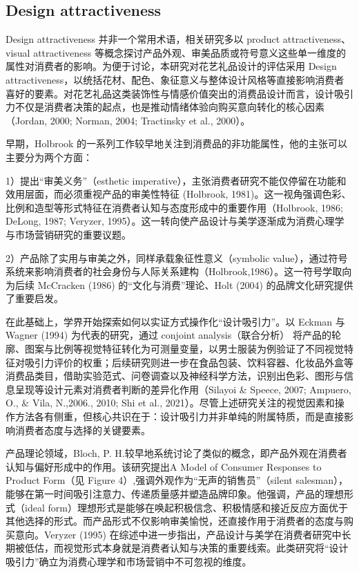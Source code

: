 \subsection{Design attractiveness}

Design attractiveness 并非一个常用术语，相关研究多以 product attractiveness、visual attractiveness 等概念探讨产品外观、审美品质或符号意义这些单一维度的属性对消费者的影响。为便于讨论，本研究对花艺礼品设计的评估采用 Design attractiveness，以统括花材、配色、象征意义与整体设计风格等直接影响消费者喜好的要素。对花艺礼品这类装饰性与情感价值突出的消费品设计而言，设计吸引力不仅是消费者决策的起点，也是推动情绪体验向购买意向转化的核心因素（Jordan, 2000; Norman, 2004; Tractinsky et al., 2000）。

早期，Holbrook 的一系列工作较早地关注到消费品的非功能属性，他的主张可以主要分为两个方面：

1）提出“审美义务”（esthetic imperative），主张消费者研究不能仅停留在功能和效用层面，而必须重视产品的审美性特征 (Holbrook, 1981)。这一视角强调色彩、比例和造型等形式特征在消费者认知与态度形成中的重要作用（Holbrook, 1986; DeLong, 1987; Veryzer, 1995）。这一转向使产品设计与美学逐渐成为消费心理学与市场营销研究的重要议题。

2）产品除了实用与审美之外，同样承载象征性意义（symbolic value），通过符号系统来影响消费者的社会身份与人际关系建构（Holbrook,1986）。这一符号学取向为后续 McCracken (1986) 的“文化与消费”理论、Holt (2004) 的品牌文化研究提供了重要启发。

在此基础上，学界开始探索如何以实证方式操作化“设计吸引力”。以 Eckman 与 Wagner (1994) 为代表的研究，通过 conjoint analysis（联合分析） 将产品的轮廓、图案与比例等视觉特征转化为可测量变量，以男士服装为例验证了不同视觉特征对吸引力评价的权重；后续研究则进一步在食品包装、饮料容器、化妆品外盒等消费品类目，借助实验范式、问卷调查以及神经科学方法，识别出色彩、图形与信息呈现等设计元素对消费者判断的差异化作用（Silayoi \& Speece, 2007; Ampuero, O., \& Vila, N.,2006., 2010; Shi et al., 2021）。尽管上述研究关注的视觉因素和操作方法各有侧重，但核心共识在于：设计吸引力并非单纯的附属特质，而是直接影响消费者态度与选择的关键要素。

产品理论领域，Bloch, P. H.较早地系统讨论了类似的概念，即产品外观在消费者认知与偏好形成中的作用。该研究提出A Model of Consumer Responses to Product Form（见 Figure 4）,强调外观作为“无声的销售员”（silent salesman），能够在第一时间吸引注意力、传递质量感并塑造品牌印象。他强调，产品的理想形式（ideal form）理想形式是能够在唤起积极信念、积极情感和接近反应方面优于其他选择的形式。而产品形式不仅影响审美愉悦，还直接作用于消费者的态度与购买意向。Veryzer (1995) 在综述中进一步指出，产品设计与美学在消费者研究中长期被低估，而视觉形式本身就是消费者认知与决策的重要线索。此类研究将“设计吸引力”确立为消费心理学和市场营销中不可忽视的维度。


